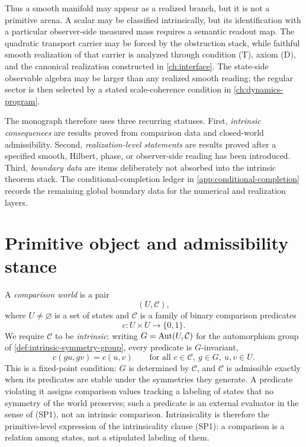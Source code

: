 Thus a smooth manifold may appear as a realized branch, but it is not a
primitive arena.
A scalar may be classified intrinsically, but its identification with a
particular observer-side measured mass requires a semantic readout map.
The quadratic transport carrier may be forced by the obstruction stack,
while faithful smooth realization of that carrier is analyzed through
condition \textup{(T)}, axiom \textup{(D)}, and the canonical realization
constructed in \cref{ch:interface}.
The state-side observable algebra may be larger than any realized smooth
reading; the regular sector is then selected by a stated scale-coherence
condition in \cref{ch:dynamics-program}.

The monograph therefore uses three recurring statuses.
First, \emph{intrinsic consequences} are results proved from comparison
data and closed-world admissibility.
Second, \emph{realization-level statements} are results proved after a
specified smooth, Hilbert, phase, or observer-side reading has been
introduced.
Third, \emph{boundary data} are items deliberately not absorbed into the
intrinsic theorem stack.
The conditional-completion ledger in \cref{app:conditional-completion}
records the remaining global boundary data for the numerical and
realization layers.

\section{Primitive object and admissibility stance}
\begin{definition}
	\label{def:intro-comparison-world}
	A \emph{comparison world} is a pair
	\[
		(U,\mathcal C),
	\]
	where \(U\neq\varnothing\) is a set of states and
	\(\mathcal C\) is a family of binary comparison predicates
	\[
		c:U\times U\to\{0,1\}.
	\]
	We require \(\mathcal C\) to be \emph{intrinsic}: writing
	\(G=\operatorname{Aut}(U,\mathcal C)\) for the automorphism group of
	\cref{def:intrinsic-symmetry-group}, every predicate is
	\(G\)-invariant,
	\[
		c(gu,gv)=c(u,v)
		\qquad
		\text{for all }c\in\mathcal C,\ g\in G,\ u,v\in U.
	\]
	This is a fixed-point condition: \(G\) is determined by \(\mathcal C\),
	and \(\mathcal C\) is admissible exactly when its predicates are stable
	under the symmetries they generate. A predicate violating it assigns
	comparison values tracking a labeling of states that no symmetry of the
	world preserves; such a predicate is an external evaluator in the sense
	of \textup{(SP1)}, not an intrinsic comparison. Intrinsicality is
	therefore the primitive-level expression of the intrinsicality clause
	\textup{(SP1)}: a comparison is a relation among states, not a
	stipulated labeling of them.
\end{definition}

